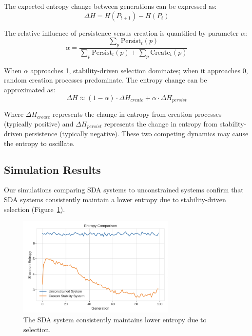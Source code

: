 \documentclass[preprint,12pt]{elsarticle}
\begin{document}
The expected entropy change between generations can be expressed as:
\begin{equation}
\Delta H = H(P_{t+1}) - H(P_t)
\end{equation}

The relative influence of persistence versus creation is quantified by parameter $\alpha$:
\begin{equation}
\alpha = \frac{\sum_p \mathrm{Persist}_t(p)}{\sum_p \mathrm{Persist}_t(p) + \sum_p \mathrm{Create}_t(p)}
\end{equation}

When $\alpha$ approaches 1, stability-driven selection dominates; when it approaches 0, random creation processes predominate. The entropy change can be approximated as:
\begin{equation}
\Delta H \approx (1 - \alpha) \cdot \Delta H_{create} + \alpha \cdot \Delta H_{persist}
\end{equation}

Where $\Delta H_{create}$ represents the change in entropy from creation processes (typically positive) and $\Delta H_{persist}$ represents the change in entropy from stability-driven persistence (typically negative). These two competing dynamics may cause the entropy to oscillate.

\subsection{Simulation Results}

Our simulations comparing SDA systems to unconstrained systems confirm that SDA systems consistently maintain a lower entropy due to stability-driven selection (Figure~\ref{fig:figure_3}).

\begin{figure}[h]
    \centering
    \includegraphics[width=0.7\textwidth]{figure_3.png}
    \caption{The SDA system consistently maintains lower entropy due to selection.}
    \label{fig:figure_3}
\end{figure}
\end{document}
